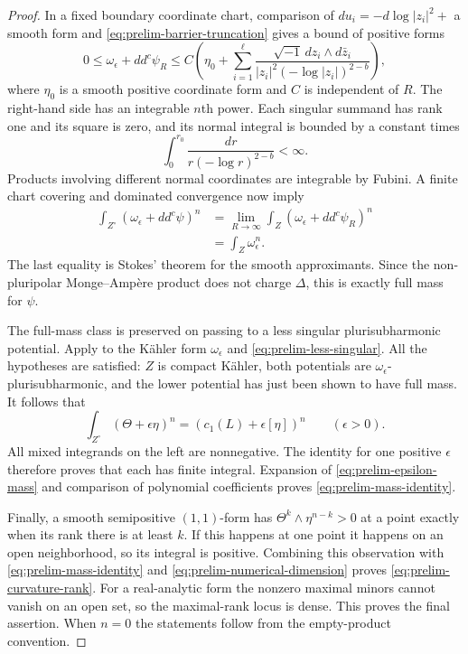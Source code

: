 \begin{proof}
In a fixed boundary coordinate chart, comparison of
$du_i=-d\log|z_i|^2+$ a smooth form and
\eqref{eq:prelim-barrier-truncation} gives a bound of positive forms
\begin{equation}\label{eq:prelim-local-majorant}
 0\leq\omega_\epsilon+dd^c\psi_R
 \leq C\left(\eta_0+
       \sum_{i=1}^{\ell}
       \frac{\sqrt{-1}\,dz_i\wedge d\bar z_i}
       {|z_i|^2(-\log|z_i|)^{2-b}}\right),
\end{equation}
where $\eta_0$ is a smooth positive coordinate form and $C$ is independent
of $R$.  The right-hand side has an integrable $n$th power.  Each
singular summand has rank one and its square is zero, and its normal
integral is bounded by a constant times
\[
 \int_0^{r_0}\frac{dr}{r(-\log r)^{2-b}}<\infty.
\]
Products involving different normal coordinates are integrable by
Fubini.  A finite chart covering and dominated convergence now imply
\begin{align*}
 \int_{Z^\circ}(\omega_\epsilon+dd^c\psi)^n
  &=\lim_{R\to\infty}
        \int_Z(\omega_\epsilon+dd^c\psi_R)^n\\
  &=\int_Z\omega_\epsilon^n.
\end{align*}
The last equality is Stokes' theorem for the smooth approximants.  Since
the non-pluripolar Monge--Ampère product does not charge $\Delta$, this
is exactly full mass for $\psi$.

The full-mass class is preserved on passing to a less singular
plurisubharmonic potential.  Apply
\cite[Proposition 1.6]{GZ} to the Kähler form $\omega_\epsilon$ and
\eqref{eq:prelim-less-singular}.  All the hypotheses are satisfied:
$Z$ is compact Kähler, both potentials are
$\omega_\epsilon$-plurisubharmonic, and the lower potential has just
been shown to have full mass.  It follows that
\begin{equation}\label{eq:prelim-epsilon-mass}
 \int_{Z^\circ}(\Theta+\epsilon\eta)^n
       =(c_1(L)+\epsilon[\eta])^n
       \qquad(\epsilon>0).
\end{equation}
All mixed integrands on the left are nonnegative.  The identity for one
positive $\epsilon$ therefore proves that each has finite integral.
Expansion of \eqref{eq:prelim-epsilon-mass} and comparison of polynomial
coefficients proves \eqref{eq:prelim-mass-identity}.

Finally, a smooth semipositive $(1,1)$-form has
$\Theta^k\wedge\eta^{n-k}>0$ at a point exactly when its rank there is
at least $k$.  If this happens at one point it happens on an open
neighborhood, so its integral is positive.  Combining this observation
with \eqref{eq:prelim-mass-identity} and
\eqref{eq:prelim-numerical-dimension} proves
\eqref{eq:prelim-curvature-rank}.  For a real-analytic form the nonzero
maximal minors cannot vanish on an open set, so the maximal-rank locus
is dense.  This proves the final assertion.  When
$n=0$ the statements follow from the empty-product convention.
\end{proof}

